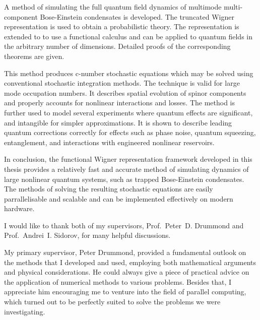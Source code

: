 

\cleardoublepage



A method of simulating the full quantum field dynamics of multimode multi-component Bose-Einstein condensates is developed.
The truncated Wigner representation is used to obtain a probabilistic theory.
The representation is extended to to use a functional calculus and can be applied to quantum fields in the arbitrary number of dimensions.
Detailed proofs of the corresponding theorems are given.

This method produces c-number stochastic equations which may be solved using conventional stochastic integration methods.
The technique is valid for large mode occupation numbers.
It describes spatial evolution of spinor components and properly accounts for nonlinear interactions and losses.
The method is further used to model several experiments where quantum effects are significant, and intangible for simpler approximations.
It is shown to describe leading quantum corrections correctly for effects such as phase noise, quantum squeezing, entanglement, and interactions with engineered nonlinear reservoirs.

In conclusion, the functional Wigner representation framework developed in this thesis provides a relatively fast and accurate method of simulating dynamics of large nonlinear quantum systems, such as trapped Bose-Einstein condensates.
The methods of solving the resulting stochastic equations are easily parrallelisable and scalable and can be implemented effectively on modern hardware.


\cleardoublepage


I would like to thank both of my supervisors, Prof.~Peter~D. Drummond and Prof.~Andrei~I. Sidorov, for many helpful discussions.

My primary supervisor, Peter Drummond, provided a fundamental outlook on the methods that I developed and used, employing both mathematical arguments and physical considerations.
He could always give a piece of practical advice on the application of numerical methods to various problems.
Besides that, I appreciate him encouraging me to venture into the field of parallel computing, which turned out to be perfectly suited to solve the problems we were investigating.

